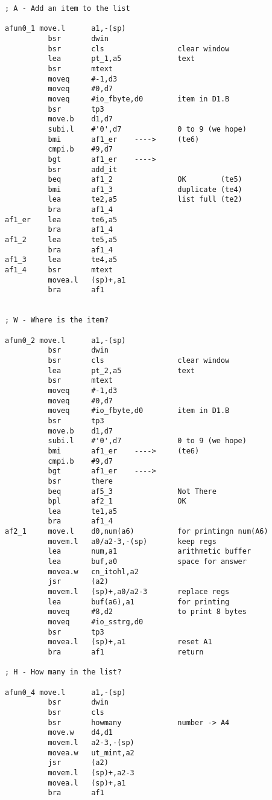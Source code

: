 \begin{lstlisting}[firstnumber=1,caption={George's Linked List Example Program}]
; A - Add an item to the list

afun0_1 move.l      a1,-(sp)
          bsr       dwin
          bsr       cls                 clear window
          lea       pt_1,a5             text
          bsr       mtext
          moveq     #-1,d3
          moveq     #0,d7
          moveq     #io_fbyte,d0        item in D1.B
          bsr       tp3
          move.b    d1,d7
          subi.l    #'0',d7             0 to 9 (we hope)
          bmi       af1_er    ---->     (te6)
          cmpi.b    #9,d7
          bgt       af1_er    ---->
          bsr       add_it
          beq       af1_2               OK        (te5)
          bmi       af1_3               duplicate (te4)
          lea       te2,a5              list full (te2)
          bra       af1_4
af1_er    lea       te6,a5
          bra       af1_4
af1_2     lea       te5,a5
          bra       af1_4
af1_3     lea       te4,a5
af1_4     bsr       mtext
          movea.l   (sp)+,a1
          bra       af1


; W - Where is the item?

afun0_2 move.l      a1,-(sp)
          bsr       dwin
          bsr       cls                 clear window
          lea       pt_2,a5             text
          bsr       mtext
          moveq     #-1,d3
          moveq     #0,d7
          moveq     #io_fbyte,d0        item in D1.B
          bsr       tp3
          move.b    d1,d7
          subi.l    #'0',d7             0 to 9 (we hope)
          bmi       af1_er    ---->     (te6)
          cmpi.b    #9,d7
          bgt       af1_er    ---->
          bsr       there
          beq       af5_3               Not There
          bpl       af2_1               OK
          lea       te1,a5
          bra       af1_4
af2_1     move.l    d0,num(a6)          for printingn num(A6)
          movem.l   a0/a2-3,-(sp)       keep regs
          lea       num,a1              arithmetic buffer
          lea       buf,a0              space for answer
          movea.w   cn_itohl,a2
          jsr       (a2)
          movem.l   (sp)+,a0/a2-3       replace regs
          lea       buf(a6),a1          for printing
          moveq     #8,d2               to print 8 bytes
          moveq     #io_sstrg,d0
          bsr       tp3
          movea.l   (sp)+,a1            reset A1
          bra       af1                 return

; H - How many in the list?

afun0_4 move.l      a1,-(sp)
          bsr       dwin
          bsr       cls
          bsr       howmany             number -> A4
          move.w    d4,d1
          movem.l   a2-3,-(sp)
          movea.w   ut_mint,a2
          jsr       (a2)
          movem.l   (sp)+,a2-3
          movea.l   (sp)+,a1
          bra       af1


\end{lstlisting}
